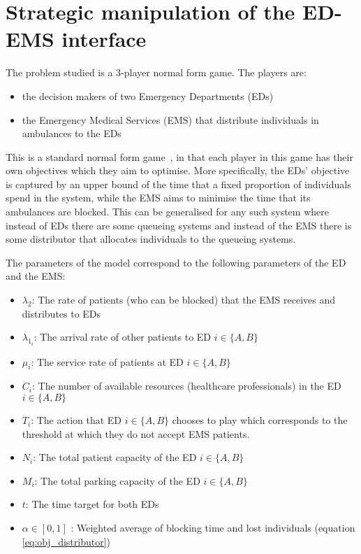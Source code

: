 \section{Strategic manipulation of the ED-EMS interface} \label{sec:model_overview}

The problem studied is a 3-player normal form game. The players are:
  
\begin{itemize}
    \item the decision makers of two Emergency Departments (EDs)
    \item the Emergency Medical Services (EMS) that distribute individuals in 
    ambulances to the EDs
\end{itemize}

This is a standard normal form game~\cite{Maschler2013},  
in that each player in this game has their own objectives which they aim to 
optimise.
More specifically, the EDs' objective is captured by an upper bound
of the time that a fixed proportion of individuals spend in the system, 
while the EMS aims to minimise the time that its ambulances 
are blocked.
This can be generalised for any such system where instead of EDs there are some
queueing systems and instead of the EMS there is some distributor that allocates
individuals to the queueing systems.

The parameters of the model correspond to the following parameters of the ED 
and the EMS:

\begin{itemize}
    \item \( \lambda_2 \): The rate of patients (who can be blocked) that the 
    EMS receives and distributes to EDs
    \item \( \lambda_{1_i} \): The arrival rate of other patients to ED 
    \(i\in\{A, B\}\)
    \item \( \mu_i \): The service rate of patients at ED \(i\in\{A, B\}\)
    \item \( C_i \): The number of available resources (healthcare 
    professionals) in the ED \(i\in\{A, B\}\)
    \item \( T_i \): The action that ED \(i\in\{A, B\} \) chooses to play which 
    corresponds to the threshold at which they do not accept EMS patients.
    \item \( N_i \): The total patient capacity of the ED \(i\in\{A, B\} \)
    \item \( M_i \): The total parking capacity of the ED \(i\in\{A, B\} \)
    \item \( t \): The time target for both EDs
    \item \( \alpha \in [0, 1] \) : Weighted average of blocking time and 
    lost individuals (equation \ref{eq:obj_distributor})
\end{itemize}

